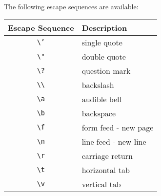 \documentclass{report}
\begin{document}
    The following escape sequences are available:
    \begin{center}
    \begin{tabular}{|c|l|}
        \hline
        \textbf{Escape Sequence} & \textbf{Description} \\
        \hline
        \texttt{\textbackslash'} & single quote \\
        \texttt{\textbackslash"} & double quote \\
        \texttt{\textbackslash?} & question mark \\
        \texttt{\textbackslash\textbackslash} & backslash \\
        \texttt{\textbackslash a} & audible bell \\
        \texttt{\textbackslash b} & backspace \\
        \texttt{\textbackslash f} & form feed - new page \\
        \texttt{\textbackslash n} & line feed - new line \\
        \texttt{\textbackslash r} & carriage return \\
        \texttt{\textbackslash t} & horizontal tab \\
        \texttt{\textbackslash v} & vertical tab \\
        \hline
        \end{tabular}
    \end{center}


    \pagebreak \bigbreak \noindent 
\end{document}
